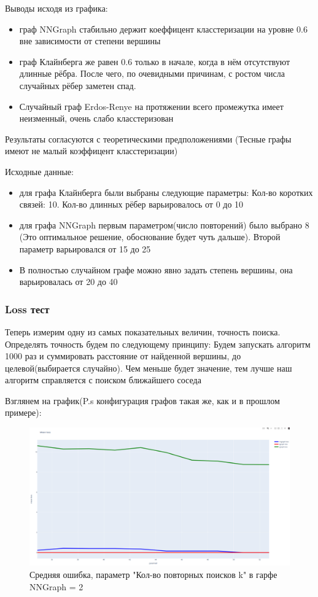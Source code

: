 Выводы исходя из графика:

\begin{itemize}
    \item граф NNGraph стабильно держит коеффицент класстеризации на уровне 0.6 вне
    зависимости от степени вершины 
    \item граф Клайнберга же равен 0.6 только в начале, когда в нём отсутствуют длинные рёбра.
    После чего, по очевидными причинам, с ростом числа случайных рёбер за\-метен спад.
    \item Случайный граф Erdos-Renye на протяжении всего промежутка имеет неизменный, очень
    слабо класстеризован
\end{itemize}
Результаты согласуются с теоретическими предположениями (Тесные графы имеют не малый коэффицент класстеризации)

Исходные данные:
\begin{itemize}
    \item для графа Клайнберга были выбраны следующие параметры: Кол-во коротких свя\-зей: 10. Кол-во длинных
рёбер варьировалось от 0 до 10
    \item для графа NNGraph первым параметром(число повторений) было выбрано 8 (Это оптимальное решение,
обоснование будет чуть дальше). Второй параметр варьиро\-вался от 15 до 25
    \item В полностью случайном графе можно явно задать степень вершины, она варьирова\-лась от 20 до 40
\end{itemize}

\subsubsection{Loss тест}

Теперь измерим одну из самых показательных величин, точность поиска.
Определять точность будем по следующему принципу: Будем запускать алгоритм 1000 раз и 
сумми\-ровать расстояние от найденной вершины, до целевой(выбирается случайно).
Чем меньше будет значение, тем лучше наш алгоритм справляется с поиском ближайшего соседа

Взглянем на график(P.s конфигурация графов такая же, как и в прошлом примере):
\begin{figure}[H]
    \centering
    \includegraphics[scale=0.25]{./pictures/sum_loss1.png}
    \caption{Средняя ошибка, параметр "Кол-во повторных поисков k" в гарфе NNGraph = 2 } \label{sum_loss}
\end{figure}


